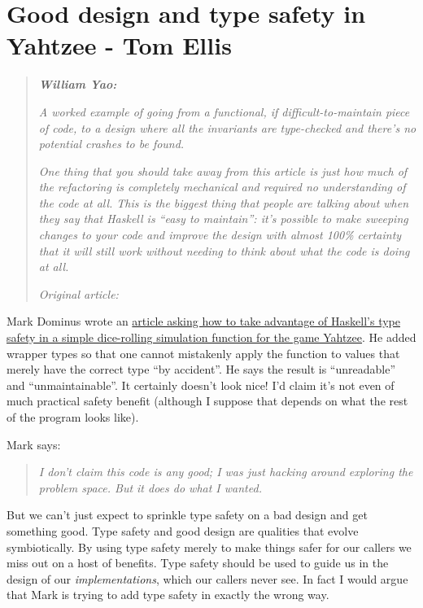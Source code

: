 \chapter{Good design and type safety in Yahtzee - Tom Ellis}
\label{sec:good_design_and_typesafety}


\begin{quotation}
\noindent\textit{\textbf{William Yao:}}

\textit{A worked example of going from a functional, if difficult-to-maintain piece of code, to a design where all the invariants are type-checked and there's no potential crashes to be found.}

\textit{One thing that you should take away from this article is just how much of the refactoring is completely mechanical and required no understanding of the code at all. This is the biggest thing that people are talking about when they say that Haskell is ``easy to maintain'': it's possible to make sweeping changes to your code and improve the design with almost 100\% certainty that it will still work without needing to think about what the code is doing at all.}

\vspace{\baselineskip}

\noindent\textit{Original article:  \cite{good_design_and_type_safety_in_yahtzee}}
\end{quotation}
Mark Dominus wrote an \href{https://blog.plover.com/prog/haskell/type-markers.html}{article asking how to take advantage of Haskell's type safety in a simple dice-rolling simulation function for the game Yahtzee}. He added wrapper types so that one cannot mistakenly apply the function to values that merely have the correct type ``by accident''. He says the result is ``unreadable'' and ``unmaintainable''. It certainly doesn't look nice! I'd claim it's not even of much practical safety benefit (although I suppose that depends on what the rest of the program looks like).

\vspace{\baselineskip}

Mark says:
\begin{quotation}
\noindent \textit{I don't claim this code is any good; I was just hacking around exploring the problem space. But it does do what I wanted.}
\end{quotation} 
But we can't just expect to sprinkle type safety on a bad design and get something good. Type safety and good design are qualities that evolve symbiotically. By using type safety merely to make things safer for our callers we miss out on a host of benefits. Type safety should be used to guide us in the design of our \textit{implementations}, which our callers never see. In fact I would argue that Mark is trying to add type safety in exactly the wrong way.

